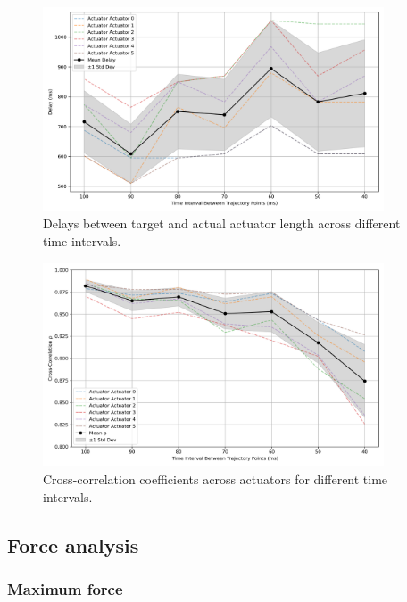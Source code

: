 \begin{figure}[H]
    \centering
    \includegraphics[width=0.9\textwidth]{figures/actuator_delays.png}
    \caption{Delays between target and actual actuator length across different time intervals.}
    \label{fig:actuator_delays_2}
\end{figure}

\begin{figure}[H]
    \centering
    \includegraphics[width=0.9\textwidth]{figures/actuator_rhos.png}
    \caption{Cross-correlation coefficients across actuators for different time intervals.}
    \label{fig:actuator_rhos_2}
\end{figure}

\subsection{Force analysis}

\subsubsection{Maximum force}

